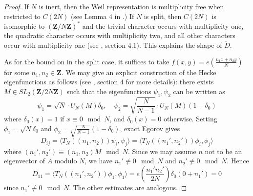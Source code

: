 \documentclass[12pt]{amsart}
\theoremstyle{plain}
\newcommand{\Z}{{\mathbf Z}}
\newcommand{\T}{\TN}
\newcommand{\weil}{U_N}
\newcommand{\TN}{T_N}  %
\newcommand{\OPN}{\operatorname{Op}_N}
\newcommand{\op}{\OPN}
\newcommand{\torusN}{C(2N)}%
\renewcommand{\^}{\widehat}
\begin{document}
\begin{proof} 
  If $N$ is inert, then the Weil representation is multiplicity free
  when restricted to $\torusN$ (see Lemma 4 in \cite{lrh2}.)  If $N$ is
  split, then $\torusN$ is isomorphic to $(\Z/N\Z)^*$ 
and the trivial character occurs with multiplicity one, the quadratic
  character occurs with multiplicity two, and all other characters
  occur with multiplicity one (see \cite{catsup}, section 4.1). This
  explains the shape of $\tilde{D}$. 

As for the bound on in the split case, it suffices to take 
$f(x,y) = e( \frac{n_1x + n_2y}{N})$ for some 
$n_1,n_2 \in \Z$. 
%
We may give an explicit construction of the Hecke
eigenfunctions as follows (see \cite{catsup}, section 4 for more
details): there exists $M \in SL_2(\Z/2N\Z)$ such
that the eigenfunctions $\psi_1,\psi_2$ can be written as 
$$
\psi_1 = \sqrt{N} \cdot \weil(M) \delta_0,
\quad \psi_2 = \sqrt{\frac{N}{N-1}} \cdot  \weil(M) (1-\delta_0)
$$
where $\delta_0(x) = 1$ if $x \equiv 0 \mod N$, and $\delta_0(x) =
0$ otherwise.  
%
Setting  $\phi_1 = \sqrt{N} \delta_0$ and
$\phi_2 = \sqrt{\frac{N}{N-1}}(1-\delta_0)$,
exact Egorov gives
$$
D_{ij} = \langle \T((n_1,n_2)) \psi_i, \psi_j \rangle 
=
\langle \T((n_1',n_2')) \phi_i, \phi_j \rangle 
$$
where $(n_1',n_2') \equiv (n_1,n_2)M \mod N$.
%
Since we may assume $n$ not to be an eigenvector of $A$ modulo $N$, 
we  have $n_1'\not \equiv 0 \mod N$ and $n_2' \not \equiv 0 \mod N$.
%
Hence
$$
D_{11} =
\langle \T((n_1',n_2')) \phi_1, \phi_1 \rangle 
=
e(\frac{n_1'n_2'}{2N})\delta_0(0+n_1')
=
0
$$
since $n_1' \not \equiv 0 \mod N$.
The other estimates are analogous. 
%

\end{proof}
\end{document}
